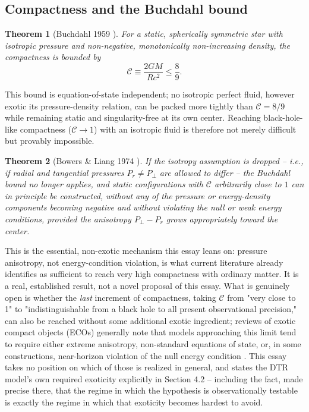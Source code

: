 \documentclass[11pt]{article}
\newtheorem{theorem}{Theorem}
\begin{document}
\subsection{Compactness and the Buchdahl bound}

\begin{theorem}[Buchdahl 1959 \cite{buchdahl1959}]
For a static, spherically symmetric star with isotropic pressure and non-negative, monotonically non-increasing density, the compactness is bounded by
\begin{equation}
\mathcal{C} \equiv \frac{2GM}{Rc^2} \leq \frac{8}{9}.
\end{equation}
\end{theorem}
This bound is equation-of-state independent; no isotropic perfect fluid, however exotic its pressure-density relation, can be packed more tightly than $\mathcal{C}=8/9$ while remaining static and singularity-free at its own center. Reaching black-hole-like compactness ($\mathcal{C}\to 1$) with an isotropic fluid is therefore not merely difficult but provably impossible.

\begin{theorem}[Bowers \& Liang 1974 \cite{bowersliang1974}]
If the isotropy assumption is dropped -- i.e., if radial and tangential pressures $P_r \neq P_\perp$ are allowed to differ -- the Buchdahl bound no longer applies, and static configurations with $\mathcal{C}$ arbitrarily close to $1$ can in principle be constructed, without any of the pressure or energy-density components becoming negative and without violating the null or weak energy conditions, provided the anisotropy $P_\perp - P_r$ grows appropriately toward the center.
\end{theorem}
This is the essential, non-exotic mechanism this essay leans on: pressure anisotropy, not energy-condition violation, is what current literature already identifies as sufficient to reach very high compactness with ordinary matter. It is a real, established result, not a novel proposal of this essay. What is genuinely open is whether the \emph{last} increment of compactness, taking $\mathcal{C}$ from "very close to 1" to "indistinguishable from a black hole to all present observational precision," can also be reached without some additional exotic ingredient; reviews of exotic compact objects (ECOs) generally note that models approaching this limit tend to require either extreme anisotropy, non-standard equations of state, or, in some constructions, near-horizon violation of the null energy condition \cite{cardosopani2019}. This essay takes no position on which of those is realized in general, and states the DTR model's own required exoticity explicitly in Section 4.2 -- including the fact, made precise there, that the regime in which the hypothesis is observationally testable is exactly the regime in which that exoticity becomes hardest to avoid.
\end{document}
